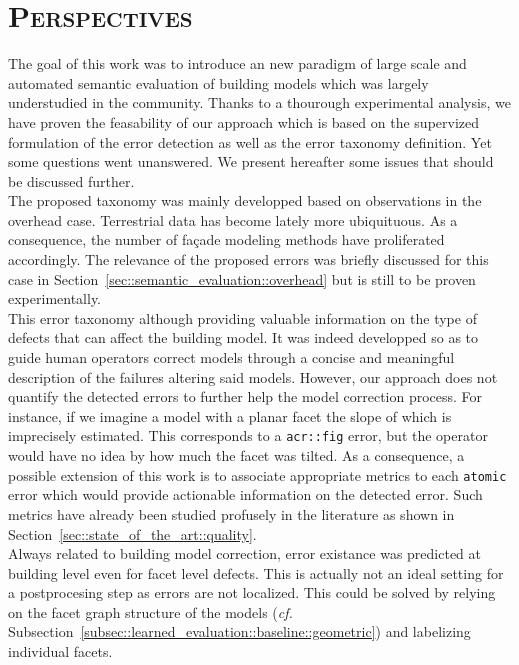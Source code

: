 \section{\textsc{Perspectives}}
    \label{sec::conclusion::perspectives}
    The goal of this work was to introduce an new paradigm of large scale and automated semantic evaluation of building models which was largely understudied in the community.
    Thanks to a thourough experimental analysis, we have proven the feasability of our approach which is based on the supervized formulation of the error detection as well as the error taxonomy definition.
    Yet some questions went unanswered.
    We present hereafter some issues that should be discussed further.\\

    The proposed taxonomy was mainly developped based on observations in the overhead case.
    Terrestrial data has become lately more ubiquituous.
    As a consequence, the number of façade modeling methods have proliferated accordingly.
    The relevance of the proposed errors was briefly discussed for this case in Section~\ref{sec::semantic_evaluation::overhead} but is still to be proven experimentally.\\

    This error taxonomy although providing valuable information on the type of defects that can affect the building model.
    It was indeed developped so as to guide human operators correct models through a concise and meaningful description of the failures altering said models.
    However, our approach does not quantify the detected errors to further help the model correction process.
    For instance, if we imagine a model with a planar facet the slope of which is imprecisely estimated.
    This corresponds to a \texttt{\acrfull{acr::fig}} error, but the operator would have no idea by how much the facet was tilted.
    As a consequence, a possible extension of this work is to associate appropriate metrics to each \texttt{atomic} error which would provide actionable information on the detected error.
    Such metrics have already been studied profusely in the literature as shown in Section~\ref{sec::state_of_the_art::quality}.\\

    Always related to building model correction, error existance was predicted at building level even for facet level defects.
    This is actually not an ideal setting for a postprocesing step as errors are not localized.
    This could be solved by relying on the facet graph structure of the models (\textit{cf.} Subsection~\ref{subsec::learned_evaluation::baseline::geometric}) and labelizing individual facets.\\


